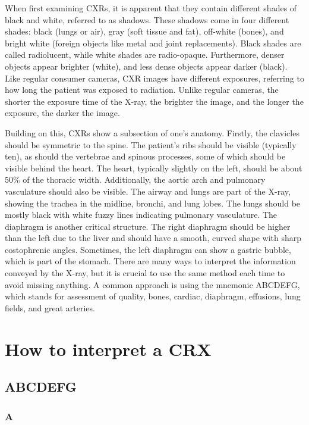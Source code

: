 \documentclass[10pt,twocolumn,letterpaper]{article}
\begin{document}
When first examining CXRs, it is apparent that they contain different shades of black and white, referred to as shadows. These shadows come in four different shades: black (lungs or air), gray (soft tissue and fat), off-white (bones), and bright white (foreign objects like metal and joint replacements). Black shades are called radiolucent, while white shades are radio-opaque. Furthermore, denser objects appear brighter (white), and less dense objects appear darker (black). Like regular consumer cameras, CXR images have different exposures, referring to how long the patient was exposed to radiation. Unlike regular cameras, the shorter the exposure time of the X-ray, the brighter the image, and the longer the exposure, the darker the image.

Building on this, CXRs show a subsection of one's anatomy. Firstly, the clavicles should be symmetric to the spine. The patient's ribs should be visible (typically ten), as should the vertebrae and spinous processes, some of which should be visible behind the heart. The heart, typically slightly on the left, should be about 50\% of the thoracic width. Additionally, the aortic arch and pulmonary vasculature should also be visible. The airway and lungs are part of the X-ray, showing the trachea in the midline, bronchi, and lung lobes. The lungs should be mostly black with white fuzzy lines indicating pulmonary vasculature. The diaphragm is another critical structure. The right diaphragm should be higher than the left due to the liver and should have a smooth, curved shape with sharp costophrenic angles. Sometimes, the left diaphragm can show a gastric bubble, which is part of the stomach. There are many ways to interpret the information conveyed by the X-ray, but it is crucial to use the same method each time to avoid missing anything. A common approach is using the mnemonic ABCDEFG, which stands for assessment of quality, bones, cardiac, diaphragm, effusions, lung fields, and great arteries.


\section{How to interpret a CRX}
\subsection{ABCDEFG}
\subsubsection{A}
\end{document}
